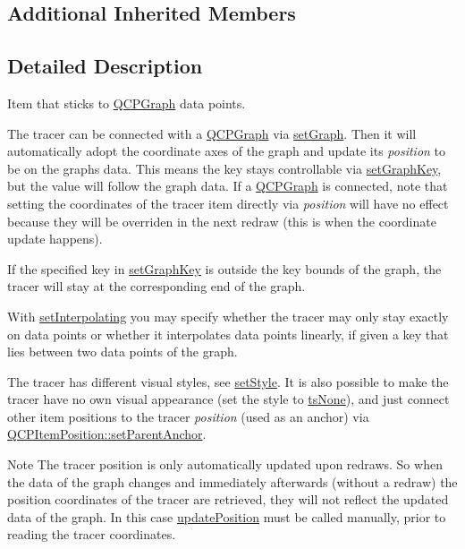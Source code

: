 \subsection*{Additional Inherited Members}


\subsection{Detailed Description}
Item that sticks to \hyperlink{class_q_c_p_graph}{Q\+C\+P\+Graph} data points. 

 The tracer can be connected with a \hyperlink{class_q_c_p_graph}{Q\+C\+P\+Graph} via \hyperlink{class_q_c_p_item_tracer_af5886f4ded8dd68cb4f3388f390790c0}{set\+Graph}. Then it will automatically adopt the coordinate axes of the graph and update its {\itshape position} to be on the graph\textquotesingle{}s data. This means the key stays controllable via \hyperlink{class_q_c_p_item_tracer_a6840143b42f3b685cedf7c6d83a704c8}{set\+Graph\+Key}, but the value will follow the graph data. If a \hyperlink{class_q_c_p_graph}{Q\+C\+P\+Graph} is connected, note that setting the coordinates of the tracer item directly via {\itshape position} will have no effect because they will be overriden in the next redraw (this is when the coordinate update happens).

If the specified key in \hyperlink{class_q_c_p_item_tracer_a6840143b42f3b685cedf7c6d83a704c8}{set\+Graph\+Key} is outside the key bounds of the graph, the tracer will stay at the corresponding end of the graph.

With \hyperlink{class_q_c_p_item_tracer_a6c244a9d1175bef12b50afafd4f5fcd2}{set\+Interpolating} you may specify whether the tracer may only stay exactly on data points or whether it interpolates data points linearly, if given a key that lies between two data points of the graph.

The tracer has different visual styles, see \hyperlink{class_q_c_p_item_tracer_a41a2ac4f1acd7897b4e2a2579c03204e}{set\+Style}. It is also possible to make the tracer have no own visual appearance (set the style to \hyperlink{class_q_c_p_item_tracer_a2f05ddb13978036f902ca3ab47076500aac27462c79146225bfa8fba24d2ee8a4}{ts\+None}), and just connect other item positions to the tracer {\itshape position} (used as an anchor) via \hyperlink{class_q_c_p_item_position_ac094d67a95d2dceafa0d50b9db3a7e51}{Q\+C\+P\+Item\+Position\+::set\+Parent\+Anchor}.

\begin{DoxyNote}{Note}
The tracer position is only automatically updated upon redraws. So when the data of the graph changes and immediately afterwards (without a redraw) the position coordinates of the tracer are retrieved, they will not reflect the updated data of the graph. In this case \hyperlink{class_q_c_p_item_tracer_a5b90296109e36384aedbc8908a670413}{update\+Position} must be called manually, prior to reading the tracer coordinates. 
\end{DoxyNote}


